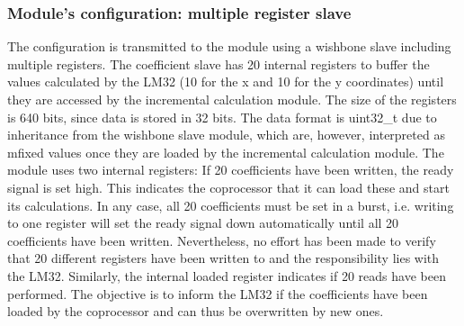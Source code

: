 \subsubsection{Module's configuration: multiple register slave}

The configuration is transmitted to the module using a wishbone slave including multiple registers.
The coefficient slave has 20 internal registers to buffer the values calculated by the LM32 (10 for the x and 10 for the y coordinates) until they are accessed by the incremental calculation module. The size of the registers is 640 bits, since data is stored in 32 bits. The data format is uint32\_t due to inheritance from the wishbone slave module, which are, however, interpreted as mfixed values once they are loaded by the incremental calculation module. The module uses two internal registers: If 20 coefficients have been written, the ready signal is set high. This indicates the coprocessor that it can load these and start its calculations. In any case, all 20 coefficients must be set in a burst, i.e. writing to one register will set the ready signal down automatically until all 20 coefficients have been written. Nevertheless, no effort has been made to verify that 20 different registers have been written to and the responsibility lies with the LM32. Similarly, the internal loaded register indicates if 20 reads have been performed. The objective is to inform the LM32 if the coefficients have been loaded by the coprocessor and can thus be overwritten by new ones.

